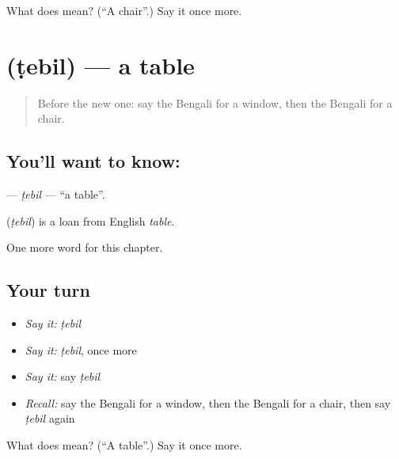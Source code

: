 \begin{tcolorbox}[breakable,colback=teal!4,colframe=teal!35!black,title={Before you move on}]
What does  mean? (\textquotedblleft{}A chair\textquotedblright{}.) Say it once more.
\end{tcolorbox}
\section[\texorpdfstring{\bn{টেবিল} (ṭebil)}{টেবিল (ṭebil)}]{ (ṭebil) — a table}

\label{lesson:BN-C60-tebil}



\begin{quote}
Before the new one: say the Bengali for a window, then the Bengali for a chair.
\end{quote}

\subsection*{You'll want to know: }
\textbf{} — \emph{ṭebil} — \textquotedblleft{}a table\textquotedblright{}.

\begin{cousinweb}
\textbf{} (\emph{ṭebil}) is a loan from English \emph{table}.
\end{cousinweb}

\begin{grammarlens}[title={What you've built}]
One more word for this chapter.
\end{grammarlens}

\subsection*{Your turn}
\begin{itemize}
\raggedright
  \item \emph{Say it:} \emph{ṭebil}
  \item \emph{Say it:} \emph{ṭebil}, once more
  \item \emph{Say it:} say \emph{ṭebil}
  \item \emph{Recall:} say the Bengali for a window, then the Bengali for a chair, then say \emph{ṭebil} again
\end{itemize}

\begin{tcolorbox}[breakable,colback=teal!4,colframe=teal!35!black,title={Before you move on}]
What does  mean? (\textquotedblleft{}A table\textquotedblright{}.) Say it once more.
\end{tcolorbox}
